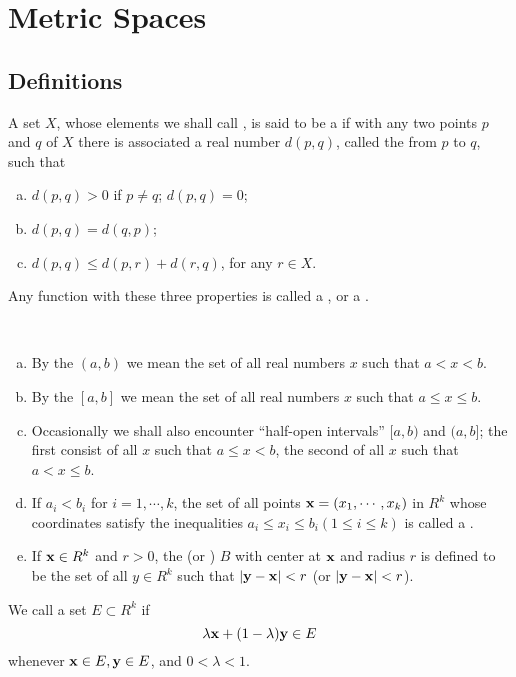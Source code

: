 \section{Metric Spaces}
\subsection{Definitions}
\begin{definition}
	A set $X$, whose elements we shall call {}, is said to be a {} if with any two points $p$ and $q$ of $X$ there is associated a real number $d(p,q)$, called the {} from $p$ to $q$, such that
	\begin{enumerate}[(a)]
		\item $d(p,q)>0$ if $p \ne q$; $d(p,q) = 0$;
		\item $d(p,q)=d(q,p)$;
		\item $d(p,q)\le d(p,r) + d(r,q)$, for any $r \in X$.
	\end{enumerate}
	Any function with these three properties is called a {}, or a {}.
\end{definition}

\begin{definition}
	~
	\begin{enumerate}[(a)]
	\item By the {} $(a,b)$ we mean the set of all real numbers $x$ such that $a<x<b$.
	\item By the {} $[a,b]$ we mean the set of all real numbers $x$ such that $a \le x \le b$.
	\item Occasionally we shall also encounter ``half-open intervals'' $[a,b)$ and $(a,b]$; the first consist of all $x$ such that $a \le x < b$, the second of all $x$ such that $a < x \le b$.
	\item If $a_i < b_i$ for $i = 1, \cdots, k$, the set of all points ${\bf{x}} = (x_1, \cdots, x_k)$ in $R^k$ whose coordinates satisfy the inequalities $a_i \le x_i \le b_i (1 \le i \le k)$ is called a {}.
	\item If ${\bf{x}} \in R^k$ and $r>0$, the {} (or {}) {} $B$ with center at ${\bf{x}}$ and radius $r$ is defined to be the set of all $y \in R^k$ such that $|{\bf{y}} - {\bf{x}}|<r$ (or $|{\bf{y}} - {\bf{x}}|<r$).
	\end{enumerate}
\end{definition}
\begin{definition}
	 We call a set $E \subset R^k$ {} if $$\lambda {\bf{x}} + (1-\lambda) {\bf{y}} \in E $$ whenever ${\bf{x}} \in E, {\bf{y}} \in E$, and $0<\lambda<1$.
\end{definition}

